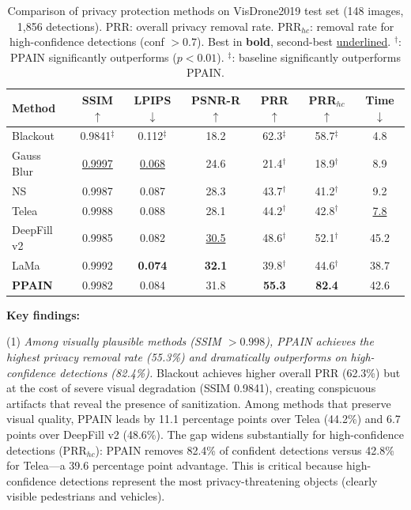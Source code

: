 \documentclass[preprint,12pt]{elsarticle}
\begin{document}
\begin{table}[t]
\centering
\small
\caption{Comparison of privacy protection methods on VisDrone2019 test set (148 images, 1,856 detections). PRR: overall privacy removal rate. PRR$_{hc}$: removal rate for high-confidence detections (conf $>0.7$). Best in \textbf{bold}, second-best \underline{underlined}. $^\dagger$: PPAIN significantly outperforms ($p < 0.01$). $^\ddagger$: baseline significantly outperforms PPAIN.}
\label{tab:main}
\begin{tabular}{@{}lcccccc@{}}
\toprule
\textbf{Method} & \textbf{SSIM}$\uparrow$ & \textbf{LPIPS}$\downarrow$ & \textbf{PSNR-R}$\uparrow$ & \textbf{PRR}$\uparrow$ & \textbf{PRR$_{hc}$}$\uparrow$ & \textbf{Time}$\downarrow$ \\
\midrule
Blackout & 0.9841$^\ddagger$ & 0.112$^\ddagger$ & 18.2 & 62.3$^\ddagger$ & 58.7$^\ddagger$ & 4.8 \\
Gauss Blur & \underline{0.9997} & \underline{0.068} & 24.6 & 21.4$^\dagger$ & 18.9$^\dagger$ & 8.9 \\
NS & 0.9987 & 0.087 & 28.3 & 43.7$^\dagger$ & 41.2$^\dagger$ & 9.2 \\
Telea & 0.9988 & 0.088 & 28.1 & 44.2$^\dagger$ & 42.8$^\dagger$ & \underline{7.8} \\
DeepFill v2 & 0.9985 & 0.082 & \underline{30.5} & 48.6$^\dagger$ & 52.1$^\dagger$ & 45.2 \\
LaMa & 0.9992 & \textbf{0.074} & \textbf{32.1} & 39.8$^\dagger$ & 44.6$^\dagger$ & 38.7 \\
\midrule
\textbf{PPAIN} & 0.9982 & 0.084 & 31.8 & \textbf{55.3} & \textbf{82.4} & 42.6 \\
\bottomrule
\end{tabular}
\end{table}

\textbf{Key findings:}

(1) \emph{Among visually plausible methods (SSIM $> 0.998$), PPAIN achieves the highest privacy removal rate (55.3\%) and dramatically outperforms on high-confidence detections (82.4\%).} Blackout achieves higher overall PRR (62.3\%) but at the cost of severe visual degradation (SSIM 0.9841), creating conspicuous artifacts that reveal the presence of sanitization. Among methods that preserve visual quality, PPAIN leads by 11.1 percentage points over Telea (44.2\%) and 6.7 points over DeepFill v2 (48.6\%). The gap widens substantially for high-confidence detections (PRR$_{hc}$): PPAIN removes 82.4\% of confident detections versus 42.8\% for Telea---a 39.6 percentage point advantage. This is critical because high-confidence detections represent the most privacy-threatening objects (clearly visible pedestrians and vehicles).
\end{document}
